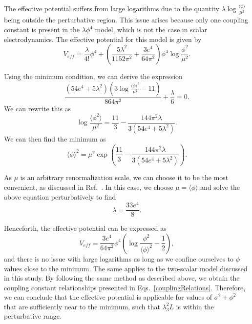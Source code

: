 \documentclass[11pt,a4paper,english,superscriptaddress,preprint,aps,prd]{revtex4}
\begin{document}

The effective potential suffers from large logarithms due to the quantity $\lambda\log\frac{\langle\phi\rangle}{\mu^2}$ being outside the perturbative region. This issue arises because only one coupling constant is present in the $\lambda\phi^4$ model, which is not the case in scalar electrodynamics. The effective potential for this model is given by
\begin{equation}
V_{eff} = \frac{\lambda}{4!}\phi^4 + \left(\frac{5\lambda^2}{1152\pi^2} + \frac{3e^4}{64\pi^2}\right)\phi^4\log\frac{\phi^2}{\mu^2}.
\end{equation}

Using the minimum condition, we can derive the expression
\begin{equation}
\frac{\left(54 e^4+5 \lambda ^2\right) \left(3 \log \frac{\langle\phi\rangle^2}{\mu ^2}-11\right)}{864 \pi ^2}+\frac{\lambda}{6} = 0.
\end{equation}
We can rewrite this as
\begin{equation}
\log\frac{\langle\phi^2\rangle}{\mu^2} = \frac{11}{3} - \frac{144\pi^2\lambda}{3(54e^4+5\lambda^2)}.
\end{equation}
We can then find the minimum as
\begin{equation}
\langle\phi\rangle^2 = \mu^2\exp\left(\frac{11}{3} - \frac{144\pi^2\lambda}{3(54e^4+5\lambda^2)}\right).
\end{equation}

As $\mu$ is an arbitrary renormalization scale, we can choose it to be the most convenient, as discussed in Ref.~\cite{Coleman:1973jx}. In this case, we choose $\mu = \langle\phi\rangle$ and solve the above equation perturbatively to find
\begin{equation}
\lambda = \frac{33e^4}{8}.
\end{equation}

Henceforth, the effective potential can be expressed as
\begin{equation}
V_{eff} = \frac{3e^4}{64\pi^2}\phi^4\left(\log\frac{\phi^2}{\langle\phi\rangle^2} -\frac{1}{2}\right),
\end{equation}
and there is no issue with large logarithms as long as we confine ourselves to $\phi$ values close to the minimum. The same applies to the two-scalar model discussed in this study. By following the same method as described above, we obtain the coupling constant relationships presented in Eqs.~\eqref{couplingRelations}. Therefore, we can conclude that the effective potential is applicable for values of $\sigma^2+\phi^2$ that are sufficiently near to the minimum, such that $\lambda_3^2L$ is within the perturbative range.
\end{document}
